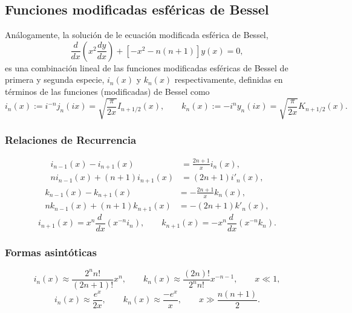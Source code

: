 \subsection{Funciones modificadas esféricas de Bessel}
Análogamente, la solución de le ecuación modificada esférica de Bessel,
\begin{equation}
\boxed{\frac{d}{dx}\left(x^2\frac{dy}{dx}\right)+[-x^2-n(n+1)]y(x)=0,}
\end{equation}
es una combinación lineal de las funciones modificadas esféricas de Bessel de primera y segunda especie, $i_n(x)$ y $k_n(x)$ respectivamente, definidas en términos de las funciones (modificadas) de Bessel como 
\begin{equation}
i_n(x):=i^{-n}j_n(ix)=\sqrt{\frac{\pi}{2x}}I_{n+1/2}(x), \qquad 
k_n(x):=-i^{n}y_n(ix)=\sqrt{\frac{\pi}{2x}}K_{n+1/2}(x).
\end{equation}

\subsubsection{Relaciones de Recurrencia}
\begin{align}
i_{n-1}(x)-i_{n+1}(x) &= \frac{2n+1}{x}i_n(x),  \\
ni_{n-1}(x)+(n+1)i_{n+1}(x) &= (2n+1)i'_n(x),
\end{align}
\begin{align}
k_{n-1}(x)-k_{n+1}(x) &= -\frac{2n+1}{x}k_n(x),\\
nk_{n-1}(x)+(n+1)k_{n+1}(x) &= -(2n+1)k'_n(x),
\end{align}
\begin{equation}
i_{n+1}(x)=x^n\frac{d\ }{dx}(x^{-n}i_n), \qquad k_{n+1}(x)=-x^n\frac{d\ }{dx}(x^{-n}k_n).
\end{equation}


\subsubsection{Formas asintóticas}
\begin{equation}
i_n(x)\approx\frac{2^nn!}{(2n+1)!}x^n, \qquad k_n(x)\approx\frac{(2n)!}{2^nn!}x^{-n-1}, \qquad x\ll 1,
\end{equation}
\begin{equation}
i_n(x)\approx \frac{e^x}{2x}, \qquad k_n(x)\approx \frac{-e^x}{x}, \qquad x\gg \frac{n(n+1)}{2}.
\end{equation}


